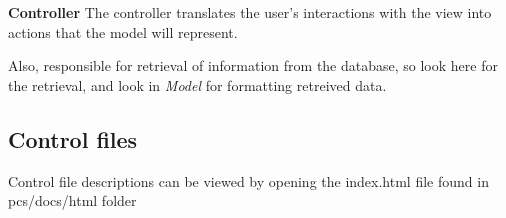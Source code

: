 {\bfseries Controller} The controller translates the user's interactions with the view into actions that the model will represent.

Also, responsible for retrieval of information from the database, so look here for the retrieval, and look in {\itshape Model} for formatting retreived data. 

 \subsection*{Control files}

Control file descriptions can be viewed by opening the index.\-html file found in pcs/docs/html folder 